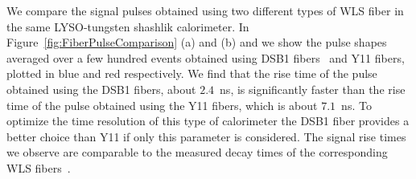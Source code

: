  We compare the signal pulses obtained using two different
 types of WLS fiber in the same LYSO-tungsten shashlik calorimeter. In
 Figure~\ref{fig:FiberPulseComparison} (a) and (b) and we show the pulse shapes
 averaged over a few hundred events obtained using DSB1 fibers~\cite{Albrecht}
 and Y11 fibers, plotted in blue and red respectively. We find that the rise
 time of the pulse obtained using the DSB1 fibers, about $2.4$~ns, is
 significantly faster than the rise time of the pulse obtained using the Y11
 fibers, which is about $7.1$~ns. To optimize the time resolution of this type
 of calorimeter the DSB1 fiber provides a better choice than Y11 if only this
 parameter is considered. The signal rise times we observe are comparable to the
 measured decay times of the corresponding WLS fibers~\cite{Albrecht}. 
 
%

